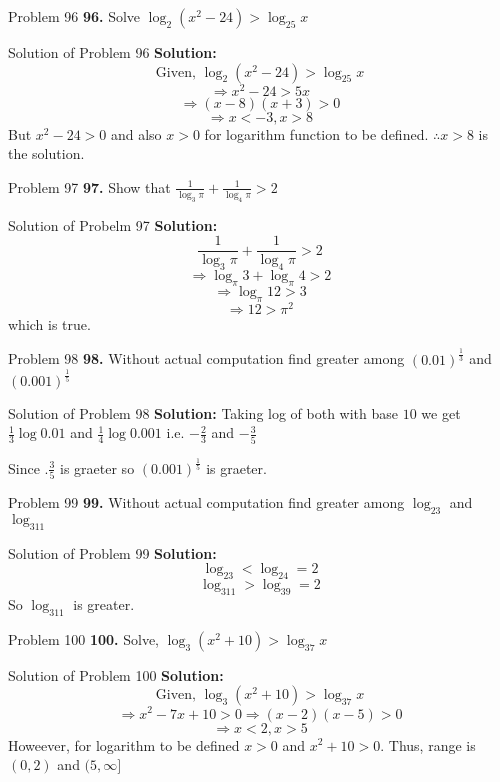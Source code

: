 \documentclass[aspectratio=169,8pt]{beamer}
\begin{document}
\begin{frame}{Problem 96}
  \textbf{96.} Solve $\log_2(x^2 - 24) > \log_25x$
\end{frame}
\begin{frame}{Solution of Problem 96}
  \textbf{Solution:} $$\text{Given,~}\log_2(x^2 - 24) > \log_25x$$
  $$\Rightarrow x^2 - 24 > 5x$$
  $$\Rightarrow (x - 8)(x + 3) > 0$$
  $$\Rightarrow x< -3, x > 8$$
  But $x^2 -24 > 0$ and also $x > 0$ for logarithm function to  be defined. $\therefore x > 8$ is the solution.
\end{frame}
\begin{frame}{Problem 97}
  \textbf{97.} Show that $\frac{1}{\log_3\pi} + \frac{1}{\log_4\pi} > 2$
\end{frame}
\begin{frame}{Solution of Probelm 97}
  \textbf{Solution:} $$\frac{1}{\log_3\pi} + \frac{1}{\log_4\pi} > 2$$
  $$\Rightarrow \log_{\pi}3 + \log_{\pi}4 > 2$$
  $$\Rightarrow \log_{\pi}12 > 3$$
  $$\Rightarrow 12 > \pi^2$$
  which is true.
\end{frame}
\begin{frame}{Problem 98}
  \textbf{98.} Without actual computation find greater among $(0.01)^{\frac{1}{3}}$ and $(0.001)^{\frac{1}{5}}$
\end{frame}
\begin{frame}{Solution of Problem 98}
  \textbf{Solution:} Taking log of both with base $10$ we get $\frac{1}{3}\log0.01$ and $\frac{1}{4}\log 0.001$ i.e. $-\frac{2}{3}$ and $-\frac{3}{5}$

  Since $.\frac{3}{5}$ is graeter so $(0.001)^{\frac{1}{5}}$ is graeter.
\end{frame}
\begin{frame}{Problem 99}
  \textbf{99.} Without actual computation find greater among $\log_23$ and $\log_311$
\end{frame}
\begin{frame}{Solution of Problem 99}
  \textbf{Solution:} $$\log_23 < \log_24 =2$$
  $$\log_311 > \log_39 = 2$$
  So $\log_311$ is greater.
\end{frame}
\begin{frame}{Problem 100}
  \textbf{100.} Solve, $\log_3(x^2 + 10) > \log_37x$
\end{frame}
\begin{frame}{Solution of Problem 100}
  \textbf{Solution:} $$\text{Given,~}\log_3(x^2 + 10) > \log_37x$$
  $$\Rightarrow x^2 - 7x + 10 > 0 \Rightarrow (x - 2)(x - 5) > 0$$
  $$\Rightarrow x < 2, x > 5$$
  Howeever, for logarithm to be defined $x > 0$ and $x^2 + 10 > 0.$ Thus, range is $(0, 2)$ and $(5, \infty]$
\end{frame}
\end{document}
